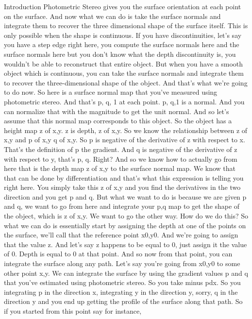 \documentclass[12pt]{article}
\begin{document}
Introduction
Photometric Stereo gives you the surface orientation
at each point on the surface.
And now what we can do is take the surface normals
and integrate them to recover the three dimensional
shape of the surface itself.
This is only possible when the shape is continuous.
If you have discontinuities, let's say
you have a step edge right here, you compute the surface
normals here and the surface normals here
but you don't know what the depth discontinuity
is, you wouldn't be able to reconstruct that entire object.
But when you have a smooth object which is continuous,
you can take the surface normals and integrate
them to recover the three-dimensional shape
of the object.
And that's what we're going to do now.
So here is a surface normal map that you've measured
using photometric stereo.
And that's p, q, 1 at each point.
p, q,1 is a normal.
And you can normalize that with the magnitude
to get the unit normal.
And so let's assume that this normal map corresponds
to this object.
So the object has a height map z of x,y.
z is depth, z of x,y.
So we know the relationship between z of x,y and p of x,y q
of x,y.
So p is negative of the derivative of z with respect
to x.
That's the definition of p the gradient.
And q is negative of the derivative of z
with respect to y, that's p, q.
Right?
And so we know how to actually go from here that is the depth
map z of x,y to the surface normal map.
We know that that can be done by differentiation
and that's what this expression is telling you right here.
You simply take this z of x,y and you find the derivatives
in the two direction and you get p and q.
But what we want to do is because we are given p and q,
we want to go from here and integrate your p,q map to get
the shape of the object, which is z of x,y.
We want to go the other way.
How do we do this?
So what we can do is essentially start by assigning the depth
at one of the points on the surface,
we'll call that the reference point x0,y0.
And we're going to assign that the value z.
And let's say z happens to be equal to 0,
just assign it the value of 0.
Depth is equal to 0 at that point.
And so now from that point, you can integrate
the surface along any path.
Let's say you're going from x0,y0 to some other point x,y.
We can integrate the surface by using the gradient values p
and q that you've estimated using photometric stereo.
So you take minus pdx.
So you integrating p in the direction x,
integrating y in the direction y, sorry, q in the direction y
and you end up getting the profile of the surface
along that path.
So if you started from this point say for instance,
\end{document}
